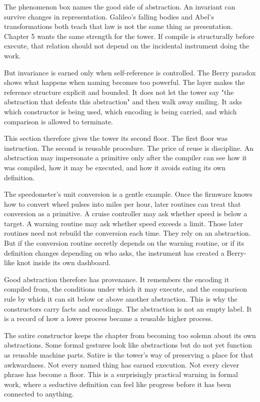The phenomenon box names the good side of abstraction. An invariant can survive
changes in representation. Galileo's falling bodies and Abel's transformations
both teach that law is not the same thing as presentation. Chapter 5 wants the
same strength for the tower. If compile is structurally before execute, that
relation should not depend on the incidental instrument doing the work.

But invariance is earned only when self-reference is controlled. The Berry
paradox shows what happens when naming becomes too powerful. The
 layer makes the reference structure explicit and bounded. It does not
let the tower say "the abstraction that defeats this abstraction" and then
walk away smiling. It asks which constructor is being used, which encoding is
being carried, and which comparison is allowed to terminate.

This section therefore gives the tower its second floor. The first floor was
instruction. The second is reusable procedure. The price of reuse is
discipline. An abstraction may impersonate a primitive only after the compiler
can see how it was compiled, how it may be executed, and how it avoids eating
its own definition.

The speedometer's unit conversion is a gentle example. Once the firmware knows
how to convert wheel pulses into miles per hour, later routines can treat that
conversion as a primitive. A cruise controller may ask whether speed is below a
target. A warning routine may ask whether speed exceeds a limit. Those later
routines need not rebuild the conversion each time. They rely on an
abstraction. But if the conversion routine secretly depends on the warning
routine, or if its definition changes depending on who asks, the instrument has
created a Berry-like knot inside its own dashboard.

Good abstraction therefore has provenance. It remembers the encoding it
compiled from, the conditions under which it may execute, and the comparison
rule by which it can sit below or above another abstraction. This is why the
constructors carry facts and encodings. The abstraction is not an empty label.
It is a record of how a lower process became a reusable higher process.

The satire constructor keeps the chapter from becoming too solemn about its
own abstractions. Some formal gestures look like abstractions but do not yet
function as reusable machine parts. Satire is the tower's way of preserving a
place for that awkwardness. Not every named thing has earned execution. Not
every clever phrase has become a floor. This is a surprisingly practical
warning in formal work, where a seductive definition can feel like progress
before it has been connected to anything.

